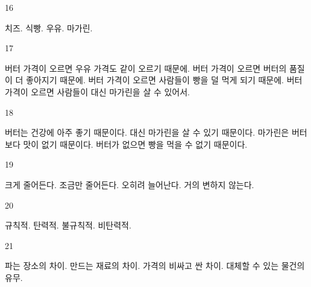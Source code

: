 \documentclass[fs9,seriesFre]{korfarm-base}
\begin{document}
\begin{kfSentenceUnit}{16}{}
\begin{kfChoices}
\kfChoice 치즈.
\kfChoice 식빵.
\kfChoice 우유.
\kfChoice 마가린.
\end{kfChoices}
\end{kfSentenceUnit}

\begin{kfSentenceUnit}{17}{}
\begin{kfChoices}
\kfChoice 버터 가격이 오르면 우유 가격도 같이 오르기 때문에.
\kfChoice 버터 가격이 오르면 버터의 품질이 더 좋아지기 때문에.
\kfChoice 버터 가격이 오르면 사람들이 빵을 덜 먹게 되기 때문에.
\kfChoice 버터 가격이 오르면 사람들이 대신 마가린을 살 수 있어서.
\end{kfChoices}
\end{kfSentenceUnit}

\begin{kfSentenceUnit}{18}{}
\begin{kfChoices}
\kfChoice 버터는 건강에 아주 좋기 때문이다.
\kfChoice 대신 마가린을 살 수 있기 때문이다.
\kfChoice 마가린은 버터보다 맛이 없기 때문이다.
\kfChoice 버터가 없으면 빵을 먹을 수 없기 때문이다.
\end{kfChoices}
\end{kfSentenceUnit}

\begin{kfSentenceUnit}{19}{}
\begin{kfChoices}
\kfChoice 크게 줄어든다.
\kfChoice 조금만 줄어든다.
\kfChoice 오히려 늘어난다.
\kfChoice 거의 변하지 않는다.
\end{kfChoices}
\end{kfSentenceUnit}

\begin{kfSentenceUnit}{20}{}
\begin{kfChoices}
\kfChoice 규칙적.
\kfChoice 탄력적.
\kfChoice 불규칙적.
\kfChoice 비탄력적.
\end{kfChoices}
\end{kfSentenceUnit}

\begin{kfSentenceUnit}{21}{}
\begin{kfChoices}
\kfChoice 파는 장소의 차이.
\kfChoice 만드는 재료의 차이.
\kfChoice 가격의 비싸고 싼 차이.
\kfChoice 대체할 수 있는 물건의 유무.
\end{kfChoices}
\end{kfSentenceUnit}
\end{document}
